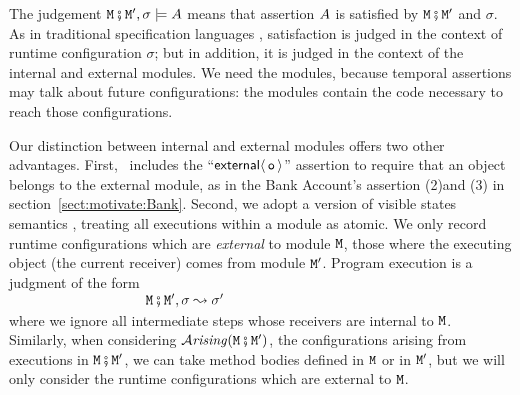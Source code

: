 
The judgement ${\mbox{\tt{\ensuremath{{\mbox{\tt{M}}}}}}} \fatsemi  {{\mbox{\tt{\ensuremath{{\mbox{\tt{M}}}}}}}'},\sigma \models A$ means that  
assertion $A$ is satisfied by  ${\mbox{\tt{\ensuremath{{\mbox{\tt{M}}}}}}} \fatsemi  {{\mbox{\tt{\ensuremath{{\mbox{\tt{M}}}}}}}'}$ and $\sigma$.  
As in traditional specification languages \cite{Leavens-etal07,Meyer92}, satisfaction is judged 
in the context of  runtime configuration $\sigma$; but in addition, it is judged in the context of the internal and external modules.
We need the modules, because temporal assertions may
talk about future configurations: the modules contain the code necessary to reach those configurations.

Our distinction between internal and external modules offers two other advantages.
First, 
\Chainmail\ includes the ``${\mathsf{external}}\langle\, {\mbox{\tt{o}}}\, \rangle$'' assertion to require
that an object belongs to the external module, as in the Bank
Account's assertion (2)and (3) in
section~\ref{sect:motivate:Bank}. Second, we adopt a version of
visible states semantics \cite{visible-state-semantics}, treating all
executions within a module as atomic.
We only record runtime configurations which are {\em external}
 to module ${\mbox{\tt{\ensuremath{{\mbox{\tt{M}}}}}}}$, \ie those where the
 executing object (\ie the current receiver) comes from module ${\mbox{\tt{\ensuremath{{\mbox{\tt{M}}}}}}}'$.
 Program execution is
 a judgment of the form\\
 $~ \strut  \hspace{1.3in}    {\mbox{\tt{\ensuremath{{\mbox{\tt{M}}}}}}} \fatsemi  {{\mbox{\tt{\ensuremath{{\mbox{\tt{M}}}}}}}'},\sigma \leadsto \sigma'$\\  
 where we ignore all intermediate steps
 whose receivers are internal to ${\mbox{\tt{\ensuremath{{\mbox{\tt{M}}}}}}}$. 
Similarly, when considering ${\mathcal{A}}\textrm{\textit{rising}}({\mbox{\tt{\ensuremath{{\mbox{\tt{M}}}}}}} \fatsemi  {{\mbox{\tt{\ensuremath{{\mbox{\tt{M}}}}}}}'})$, \ie the configurations arising from 
executions in ${\mbox{\tt{\ensuremath{{\mbox{\tt{M}}}}}}} \fatsemi  {{\mbox{\tt{\ensuremath{{\mbox{\tt{M}}}}}}}'}$, we can take method bodies defined in ${\mbox{\tt{\ensuremath{{\mbox{\tt{M}}}}}}}$ or in ${\mbox{\tt{\ensuremath{{\mbox{\tt{M}}}}}}}'$, but we will only consider the runtime 
configurations which are external to ${\mbox{\tt{\ensuremath{{\mbox{\tt{M}}}}}}}$.



